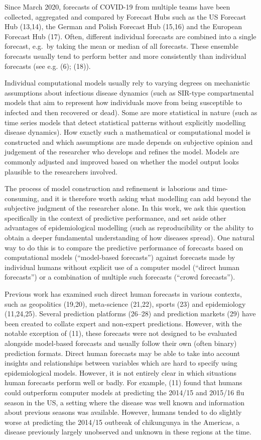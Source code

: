 \documentclass[
]{article}
\begin{document}
Since March 2020, forecasts of COVID-19 from multiple teams have been collected, aggregated and compared by Forecast Hubs such as the US Forecast Hub (13,14), the German and Polish Forecast Hub (15,16) and the European Forecast Hub (17). Often, different individual forecasts are combined into a single forecast, e.g.~by taking the mean or median of all forecasts. These ensemble forecasts usually tend to perform better and more consistently than individual forecasts (see e.g. (6); (18)).

Individual computational models usually rely to varying degrees on mechanistic assumptions about infectious disease dynamics (such as SIR-type compartmental models that aim to represent how individuals move from being susceptible to infected and then recovered or dead). Some are more statistical in nature (such as time series models that detect statistical patterns without explicitly modelling disease dynamics). How exactly such a mathematical or computational model is constructed and which assumptions are made depends on subjective opinion and judgement of the researcher who develops and refines the model. Models are commonly adjusted and improved based on whether the model output looks plausible to the researchers involved.

The process of model construction and refinement is laborious and time-consuming, and it is therefore worth asking what modelling can add beyond the subjective judgment of the researcher alone. In this work, we ask this question specifically in the context of predictive performance, and set aside other advantages of epidemiological modelling (such as reproducibility or the ability to obtain a deeper fundamental understanding of how diseases spread). One natural way to do this is to compare the predictive performance of forecasts based on computational models (``model-based forecasts'') against forecasts made by individual humans without explicit use of a computer model (``direct human forecasts'') or a combination of multiple such forecasts (``crowd forecasts'').

Previous work has examined such direct human forecasts in various contexts, such as geopolitics (19,20), meta-science (21,22), sports (23) and epidemiology (11,24,25). Several prediction platforms (26--28) and prediction markets (29) have been created to collate expert and non-expert predictions. However, with the notable exception of (11), these forecasts were not designed to be evaluated alongside model-based forecasts and usually follow their own (often binary) prediction formats. Direct human forecasts may be able to take into account insights and relationships between variables which are hard to specify using epidemiological models. However, it is not entirely clear in which situations human forecasts perform well or badly. For example, (11) found that humans could outperform computer models at predicting the 2014/15 and 2015/16 flu season in the US, a setting where the disease was well known and information about previous seasons was available. However, humans tended to do slightly worse at predicting the 2014/15 outbreak of chikungunya in the Americas, a disease previously largely unobserved and unknown in these regions at the time.
\end{document}
